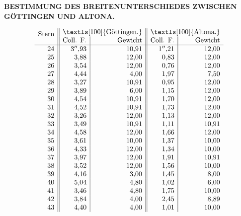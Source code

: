 \begingroup
\setlength{\abovedisplayskip}{7pt}
\setlength{\belowdisplayskip}{7pt}
\setlength{\abovedisplayshortskip}{3pt}
\setlength{\belowdisplayshortskip}{4pt}
\def\ixrad{\mathord{\vcenter{\hbox{\Large\(\surd\)}}}}
\def\ixangle#1#2#3{%
  \makebox[1.95em][r]{\(#1\)}%
  \makebox[1.45em][r]{\(#2\)}%
  \makebox[3.10em][r]{\(#3\)}}
\def\ixobsCount#1#2{\makebox[.8em][r]{#1}\enspace\makebox[2.6em][c]{#2}}
\def\ixobs#1#2#3#4#5#6#7#8#9{%
  #1 & \(\left\{\begin{array}{@{}l@{\enspace}l@{}}
  \text{Direct}&\ixangle{#2}{#3}{#4}\\
  \text{Reflectirt}&\ixangle{#5}{#6}{#7}
  \end{array}\right.\) &
  \begin{tabular}{@{}l@{}}#8\\#9\end{tabular}}

\par\clearpage
\noindent{}\parbox[t]{\dimexpr\linewidth-24mm\relax}{\centering\scriptsize\bfseries BESTIMMUNG DES BREITENUNTERSCHIEDES ZWISCHEN GÖTTINGEN UND ALTONA.}\makebox[12mm][r]{}\par\medskip

{\small
\setlength{\arraycolsep}{.85em}
\[
\begin{array}{r||r|r||r|r}
\smash{\raisebox{-.7ex}{Stern}}&
\multicolumn{2}{c||}{\text{\normalsize\textls[100]{Göttingen.}}}&
\multicolumn{2}{c}{\text{\normalsize\textls[100]{Altona.}}}\\
&\text{Coll. F.}&\text{Gewicht}&\text{Coll. F.}&\text{Gewicht}\\
\hline
24&3''{,}93&10{,}91&1''{,}21&12{,}00\\
25&3{,}88&12{,}00&0{,}83&12{,}00\\
26&3{,}54&12{,}00&0{,}76&12{,}00\\
27&4{,}44&4{,}00&1{,}97&7{,}50\\
28&3{,}27&10{,}91&0{,}95&12{,}00\\
29&3{,}89&6{,}00&1{,}15&12{,}00\\
30&4{,}54&10{,}91&1{,}70&12{,}00\\
31&4{,}52&10{,}91&1{,}73&12{,}00\\
32&3{,}26&12{,}00&1{,}13&12{,}00\\
33&3{,}49&10{,}91&1{,}11&10{,}91\\
34&4{,}58&12{,}00&1{,}66&12{,}00\\
35&3{,}61&10{,}00&1{,}37&10{,}00\\
36&4{,}33&12{,}00&1{,}34&10{,}00\\
37&3{,}97&12{,}00&1{,}91&10{,}91\\
38&3{,}52&12{,}00&1{,}56&10{,}00\\
39&4{,}16&3{,}00&1{,}45&8{,}00\\
40&5{,}04&4{,}80&1{,}02&6{,}00\\
41&3{,}46&4{,}80&1{,}75&10{,}00\\
42&3{,}84&4{,}00&2{,}45&8{,}89\\
43&4{,}40&4{,}00&1{,}01&10{,}00
\end{array}
\]
\par
}

